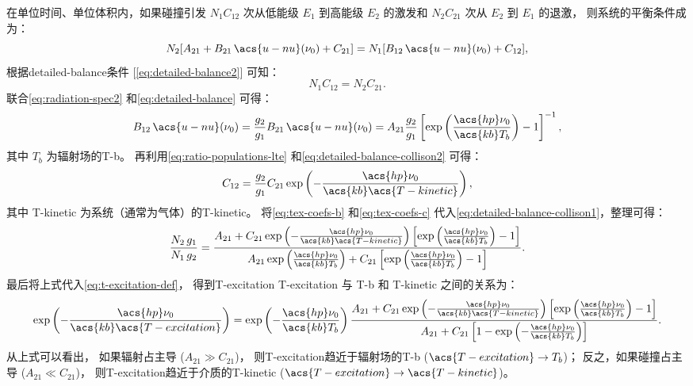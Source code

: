 在单位时间、单位体积内，如果碰撞引发 $N_1 C_{12}$ 次从低能级 $E_1$ 到高能级 $E_2$
的激发和 $N_2 C_{21}$ 次从 $E_2$ 到 $E_1$ 的退激，
则系统的平衡条件成为：
\begin{equation}
  \label{eq:detailed-balance-collison1}
  N_2 [A_{21} + B_{21} \,\acs{u-nu}(\nu_0) + C_{21}]
    = N_1 [B_{12} \,\acs{u-nu}(\nu_0) + C_{12}] ,
\end{equation}
根据\ac{detailed-balance}条件 [\autoref{eq:detailed-balance2}] 可知：
\begin{equation}
  \label{eq:detailed-balance-collison2}
  N_1 C_{12} = N_2 C_{21} .
\end{equation}
联合\autoref{eq:radiation-spec2} 和\autoref{eq:detailed-balance} 可得：
\begin{equation}
  \label{eq:tex-coefs-b}
  B_{12} \,\acs{u-nu}(\nu_0)
    = \frac{g_2}{g_1} B_{21} \,\acs{u-nu}(\nu_0)
    = A_{21} \frac{g_2}{g_1} \left[ \exp\left(
        \frac{\acs{hp} \nu_0}{\acs{kb} T_b} \right) - 1 \right]^{-1} ,
\end{equation}
其中 $T_b$ 为辐射场的\acl{T-b}。
再利用\autoref{eq:ratio-populations-lte}
和\autoref{eq:detailed-balance-collison2} 可得：
\begin{equation}
  \label{eq:tex-coefs-c}
  C_{12} = \frac{g_2}{g_1} C_{21}
    \exp\left( - \frac{\acs{hp} \nu_0}{\acs{kb} \acs{T-kinetic}} \right) ,
\end{equation}
其中 \acs{T-kinetic} 为系统（通常为气体）的\acl{T-kinetic}。
将\autoref{eq:tex-coefs-b} 和\autoref{eq:tex-coefs-c}
代入\autoref{eq:detailed-balance-collison1}，整理可得：
\begin{equation}
  \frac{N_2\,g_1}{N_1\,g_2} =
    \frac{A_{21} + C_{21}
    \exp\left( -\frac{\acs{hp} \nu_0}{\acs{kb} \acs{T-kinetic}} \right)
      \left[ \exp\left( \frac{\acs{hp} \nu_0}{\acs{kb} T_b} \right)
        - 1 \right]
    }{A_{21} \exp\left( \frac{\acs{hp} \nu_0}{\acs{kb} T_b} \right)
     + C_{21} \left[ \exp\left( \frac{\acs{hp} \nu_0}{\acs{kb} T_b}
       \right) - 1 \right]} .
\end{equation}
最后将上式代入\autoref{eq:t-excitation-def}，
得到\acl{T-excitation} \acs{T-excitation} 与 \acs{T-b} 和 \acs{T-kinetic}
之间的关系为：
\begin{equation}
  \label{eq:t-excitation}
  \exp\left(- \frac{\acs{hp} \nu_0}{\acs{kb} \acs{T-excitation}} \right) =
    \exp\left( -\frac{\acs{hp} \nu_0}{\acs{kb} T_b} \right)
    \frac{A_{21} + C_{21} \exp\left(
      -\frac{\acs{hp} \nu_0}{\acs{kb} \acs{T-kinetic}} \right)
      \left[ \exp\left( \frac{\acs{hp} \nu_0}{\acs{kb} T_b} \right)
        - 1 \right]
    }{A_{21} + C_{21} \left[ 1 - \exp\left(
      -\frac{\acs{hp} \nu_0}{\acs{kb} T_b} \right) \right]} .
\end{equation}
从上式可以看出，
如果辐射占主导 ($A_{21} \gg C_{21}$)，
则\acl{T-excitation}趋近于辐射场的\acl{T-b} ($\acs{T-excitation} \to T_b$)；
反之，如果碰撞占主导 ($A_{21} \ll C_{21}$)，
则\acl{T-excitation}趋近于介质的\acl{T-kinetic}
($\acs{T-excitation} \to \acs{T-kinetic}$)。


